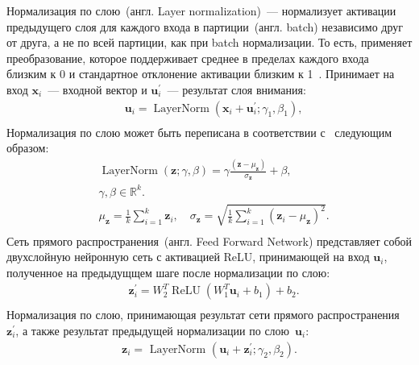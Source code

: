 Нормализация по слою~(англ. Layer normalization)~--- нормализует активации предыдущего слоя для каждого входа в партиции~(англ. batch) независимо друг от друга, а не по всей партиции, как при batch нормализации. То есть, применяет преобразование, которое поддерживает среднее в пределах каждого входа близким к 0 и стандартное отклонение активации близким к 1~\cite{ba2016layer}. Принимает на вход $\mathbf{x}_i$~--- входной вектор и $\mathbf{u}_i^{\prime}$~--- результат слоя внимания:
\begin{equation}
\begin{aligned}
&\mathbf{u}_i=\operatorname{LayerNorm}\left(\mathbf{x}_i+\mathbf{u}_i^{\prime} ; \gamma_1, \beta_1\right), \\
\end{aligned}
\end{equation}
Нормализация по слою может быть переписана в соответствии с~\cite{ba2016layer} следующим образом:
\begin{equation}
\begin{aligned}
& \operatorname{LayerNorm}(\mathbf{z} ; \gamma, \beta)=\gamma \frac{\left(\mathbf{z}-\mu_{\mathbf{z}}\right)}{\sigma_{\mathbf{z}}}+\beta, \\
& \gamma, \beta \in \mathbb{R}^k . \\
& \mu_{\mathbf{z}}=\frac{1}{k} \sum_{i=1}^k \mathbf{z}_i, \quad \sigma_{\mathbf{z}}=\sqrt{\frac{1}{k} \sum_{i=1}^k\left(\mathbf{z}_i-\mu_{\mathbf{z}}\right)^2} . \\
&
\end{aligned}
\end{equation}
Сеть прямого распространения~(англ. Feed Forward Network) представляет собой двухслойную нейронную сеть с активацией ReLU, принимающей на вход $\mathbf{u}_i$, полученное на предыдущщем шаге после нормализации по слою:
\begin{equation}
\begin{aligned}
& \mathbf{z}_i^{\prime}=W_2^T \operatorname{ReLU}\left(W_1^T \mathbf{u}_i + b_1\right) + b_2. \\
\end{aligned}
\end{equation}
Нормализация по слою, принимающая результат сети прямого распространения~$\mathbf{z}_i^{\prime}$, а также результат предыдущей нормализации по слою~$\mathbf{u}_i$:
\begin{equation}
\begin{aligned}
\mathbf{z}_i=\text { LayerNorm }\left(\mathbf{u}_i+\mathbf{z}_i^{\prime} ; \gamma_2, \beta_2\right).
\end{aligned}
\end{equation}


